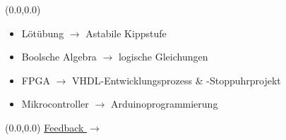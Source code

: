\documentclass[aspectratio=169, 14pt]{beamer}
\begin{document}
\begin{frame}
    \begin{textblock*}{2\paperwidth}(0.0\paperwidth,0.0\paperheight)
        \vspace*{2.0cm}
        \begin{itemize}
            \setlength\itemsep{16pt}
            \item Lötübung $\rightarrow$ Astabile Kippstufe
            \item Boolsche Algebra $\rightarrow$ logische Gleichungen
            \item FPGA $\rightarrow$ VHDL-Entwicklungsprozess \& -Stoppuhrprojekt
            \item Mikrocontroller $\rightarrow$ Arduinoprogrammierung
        \end{itemize}
    \end{textblock*}
    \framenumbersummaryslide
    \addtocounter{framenumber}{-1}
\end{frame}
\begin{frame}
    \begin{textblock*}{2\paperwidth}(0.0\paperwidth,0.0\paperheight)
        \vspace*{2.0cm}
        \hspace*{1.0cm}
        \textcolor{uniblau}{\href{https://docs.google.com/forms/d/e/1FAIpQLSdAEgryQdZ04KEDBmQFy3ldw4GMcrVsM1QriTker-OboGl9sw/viewform?usp=sf_link}{Feedback $\rightarrow$}}
    \end{textblock*}
    \framenumbersummaryslide
\end{frame}
\end{document}
